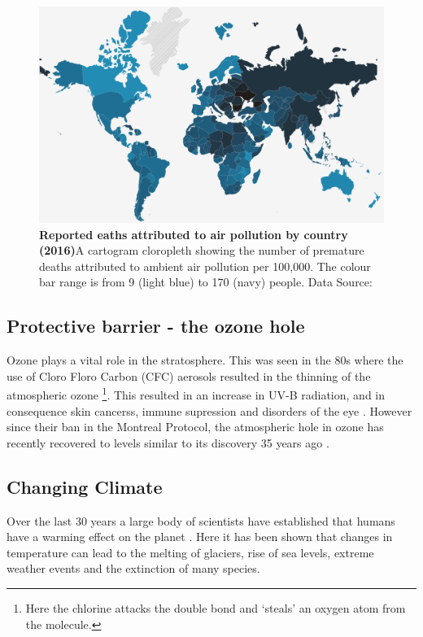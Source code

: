 \begin{figure}[H]
  \centering
  \includegraphics[width=\textwidth]{who.png}
  \caption{\textbf{Reported eaths attributed to air pollution by country (2016)}A cartogram cloropleth showing the number of premature deaths attributed to ambient air pollution per 100,000. The colour bar range is from 9 (light blue) to 170 (navy) people.  Data Source:\citep{whodata}}
  \label{fig:who}
\end{figure}

%
\subsection{Protective barrier - the ozone hole}\label{sec:ozonerole}
Ozone plays a vital role in the stratosphere. This was seen in the 80s where the use of Cloro Floro Carbon (CFC) aerosols resulted in the thinning of the atmospheric ozone \citep{ozonehole}\footnote{Here the chlorine attacks the double bond and `steals' an oxygen atom from the  molecule.}. This resulted in an increase in UV-B radiation, and in consequence skin cancerss, immune supression and disorders of the eye \citep{o3damage}. However since their ban in the Montreal Protocol, the atmospheric hole in ozone has recently recovered to levels similar to its discovery 35 years ago \citep{ozonerepair}.


\subsection{Changing Climate} \label{sec:climatechange}
Over the last 30 years a large body of scientists have established that humans have a warming effect on the planet \citep{IPCC1990Science,IPCC1995Science,IPCC2007Science,IPCC2013Science,ipbes}. Here it has been shown that changes in temperature can lead to the melting of glaciers, rise of sea levels, extreme weather events and the extinction of many species.


